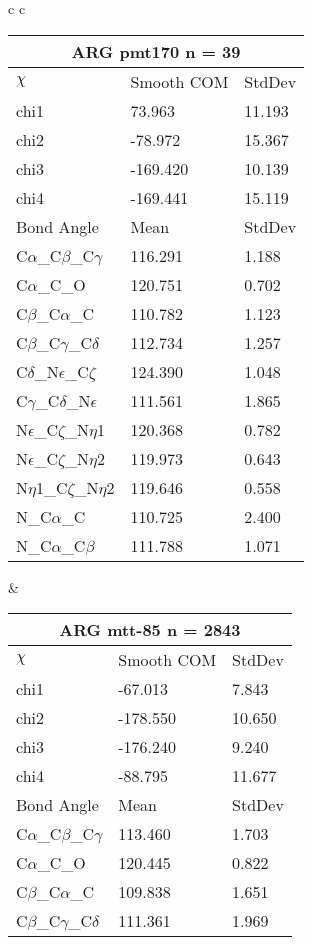 \begin{longtable}{ c c }
\begin{tabular}{ l l l }
  \toprule
  \multicolumn{3}{c}{ARG \textbf{pmt170} n = 39} \\ \toprule
  $\chi$       & Smooth COM & StdDev \\ \midrule
  chi1 & 73.963 & 11.193 \\ 
  chi2 & -78.972 & 15.367 \\ 
  chi3 & -169.420 & 10.139 \\ 
  chi4 & -169.441 & 15.119 \\ \midrule
  Bond Angle   & Mean     & StdDev \\ \midrule
  C$\alpha$\_C$\beta$\_C$\gamma$ & 116.291 & 1.188\\
  C$\alpha$\_C\_O & 120.751 & 0.702\\
  C$\beta$\_C$\alpha$\_C & 110.782 & 1.123\\
  C$\beta$\_C$\gamma$\_C$\delta$ & 112.734 & 1.257\\
  C$\delta$\_N$\epsilon$\_C$\zeta$ & 124.390 & 1.048\\
  C$\gamma$\_C$\delta$\_N$\epsilon$ & 111.561 & 1.865\\
  N$\epsilon$\_C$\zeta$\_N$\eta$1 & 120.368 & 0.782\\
  N$\epsilon$\_C$\zeta$\_N$\eta$2 & 119.973 & 0.643\\
  N$\eta$1\_C$\zeta$\_N$\eta$2 & 119.646 & 0.558\\
  N\_C$\alpha$\_C & 110.725 & 2.400\\
  N\_C$\alpha$\_C$\beta$ & 111.788 & 1.071\\
  \bottomrule
  \end{tabular}
  &
  \begin{tabular}{ l l l }
  \toprule
  \multicolumn{3}{c}{ARG \textbf{mtt-85} n = 2843} \\ \toprule
  $\chi$       & Smooth COM & StdDev \\ \midrule
  chi1 & -67.013 & 7.843 \\ 
  chi2 & -178.550 & 10.650 \\ 
  chi3 & -176.240 & 9.240 \\ 
  chi4 & -88.795 & 11.677 \\ \midrule
  Bond Angle   & Mean     & StdDev \\ \midrule
  C$\alpha$\_C$\beta$\_C$\gamma$ & 113.460 & 1.703\\
  C$\alpha$\_C\_O & 120.445 & 0.822\\
  C$\beta$\_C$\alpha$\_C & 109.838 & 1.651\\
  C$\beta$\_C$\gamma$\_C$\delta$ & 111.361 & 1.969\\

\end{tabular}
\end{longtable}
